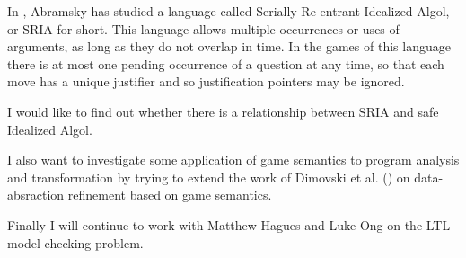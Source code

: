 \documentclass{article}
\begin{document}
\begin{list}
In \cite{abramsky:mchecking_ia}, Abramsky has studied a language
called Serially Re-entrant Idealized Algol, or SRIA for short. This
language allows multiple occurrences or uses of arguments, as long
as they do not overlap in time. In the games of this language there
is at most one pending occurrence of a question at any time, so that
each move has a unique justifier and so justification pointers may
be ignored.

I would like to find out whether there is a relationship between
SRIA and safe Idealized Algol.


I also want to investigate some application of game semantics to
program analysis and transformation by trying to extend the work of
Dimovski et al. (\cite{DBLP:conf/sas/DimovskiGL05}) on
data-absraction refinement based on game semantics.

Finally I will continue to work with Matthew Hagues and Luke Ong on
the LTL model checking problem.


\end{list}



\end{document}
